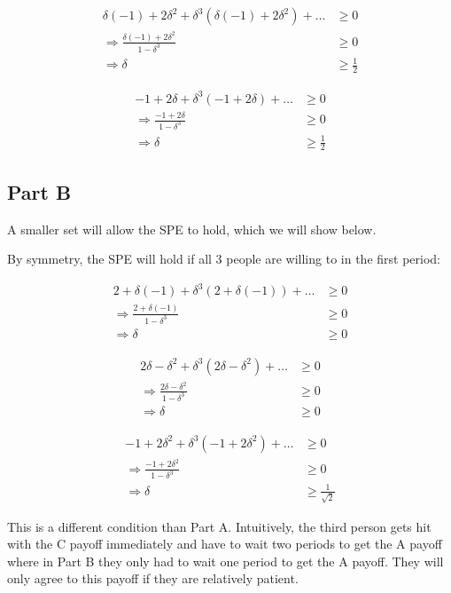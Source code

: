 \documentclass[11pt]{article} %
\begin{document}
\begin{align*}
 \delta(-1) + 2\delta^2 +\delta^3(\delta(-1) + 2\delta^2 ) + \dots &\geq 0\\
\Rightarrow \frac{\delta(-1) +2 \delta^2}{1-\delta^3} &\geq 0\\
\Rightarrow \delta &\geq  \frac{1}{2}
\end{align*}

\begin{align*}
-1 + 2\delta   +\delta^3(-1 + 2\delta  ) + \dots &\geq 0\\
\Rightarrow \frac{-1 + 2\delta }{1-\delta^3} &\geq 0\\
\Rightarrow \delta &\geq \frac{1}{2}
\end{align*}

\subsection{Part B}
A smaller set will allow the SPE to hold, which we will show below.

By symmetry, the SPE will hold if all 3 people are willing to in the first period:

\begin{align*}
2  + \delta(-1) +\delta^3(2  + \delta(-1) ) + \dots &\geq 0\\
\Rightarrow \frac{2  + \delta(-1)}{1-\delta^3} &\geq 0\\
\Rightarrow \delta &\geq 0
\end{align*}

\begin{align*}
 2\delta -\delta^2 +\delta^3(2\delta -\delta^2  ) + \dots &\geq 0\\
\Rightarrow \frac{2\delta -\delta^2 }{1-\delta^3} &\geq 0\\
\Rightarrow \delta &\geq 0
\end{align*}

\begin{align*}
-1 + 2\delta^2   +\delta^3(-1 + 2\delta^2  ) + \dots &\geq 0\\
\Rightarrow \frac{-1 + 2\delta^2 }{1-\delta^3} &\geq 0\\
\Rightarrow \delta &\geq \frac{1}{\sqrt{2}}
\end{align*}

This is a different condition than Part A. Intuitively, the third person gets hit with the C payoff immediately and have to wait two periods to get the A payoff where in Part B they only had to wait one period to get the A payoff. They will only agree to this payoff if they are relatively patient.
\end{document}
